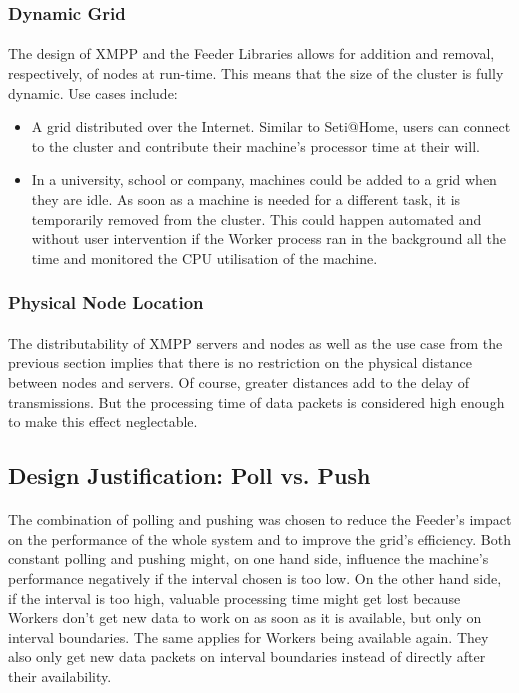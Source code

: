 \subsubsection{Dynamic Grid}
\paragraph{}
The design of XMPP and the Feeder Libraries allows for addition and removal, respectively, of nodes at run-time. This means that the size of the cluster is fully dynamic. Use cases include:
\begin{itemize}
\item A grid distributed over the Internet. Similar to Seti@Home, users can connect to the cluster and contribute their machine's processor time at their will.
\item In a university, school or company, machines could be added to a grid when they are idle. As soon as a machine is needed for a different task, it is temporarily removed from the cluster. This could happen automated and without user intervention if the Worker process ran in the background all the time and monitored the CPU utilisation of the machine.
\end{itemize}

\subsubsection{Physical Node Location}
\paragraph{}
The distributability of XMPP servers and nodes as well as the use case from the previous section implies that there is no restriction on the physical distance between nodes and servers. Of course, greater distances add to the delay of transmissions. But the processing time of data packets is considered high enough to make this effect neglectable.

\subsection{Design Justification: Poll vs. Push}
\label{sec:designjustification}
\paragraph{}
The combination of polling and pushing was chosen to reduce the Feeder's impact on the performance of the whole system and to improve the grid's efficiency. Both constant polling and pushing might, on one hand side, influence the machine's performance negatively if the interval chosen is too low. On the other hand side, if the interval is too high, valuable processing time might get lost because Workers don't get new data to work on as soon as it is available, but only on interval boundaries. The same applies for Workers being available again. They also only get new data packets on interval boundaries instead of directly after their availability.

